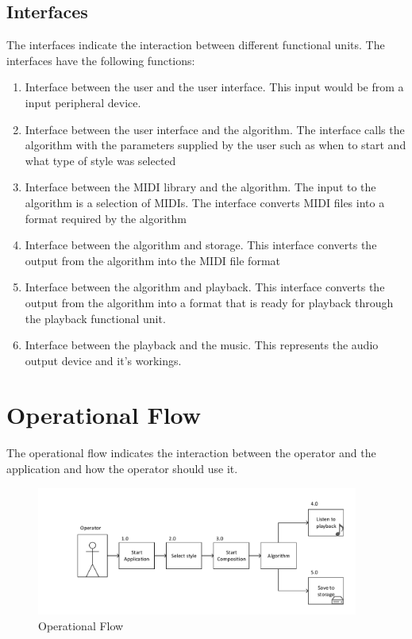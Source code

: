 \section{Interfaces}
The interfaces indicate the interaction between different functional units.
The interfaces have the following functions:
\begin{enumerate}
\item Interface between the user and the user interface. This input would be from a input peripheral device.
\item Interface between the user interface and the algorithm. The interface calls the algorithm with the parameters supplied by the user such as when to start and what type of style was selected
\item Interface between the \ac{MIDI} library and the algorithm. The input to the algorithm is a selection of \acp{MIDI}. The interface converts \ac{MIDI} files into a format required by the algorithm
\item Interface between the algorithm and storage. This interface converts the output from the algorithm into the \ac{MIDI} file format
\item Interface between the algorithm and playback. This interface converts the output from the algorithm into a format that is ready for playback through the playback functional unit.
\item Interface between the playback and the music. This represents the audio output device and it's workings.
\end{enumerate}


\chapter{Operational Flow}

The operational flow indicates the interaction between the operator and the application and how the operator should use it.

\begin{figure}[ht]
\centerline{\includegraphics[width=400px]{../images/operational_flow.pdf}}
\caption{Operational Flow}
\label{ims:oppflow}
\end{figure}

